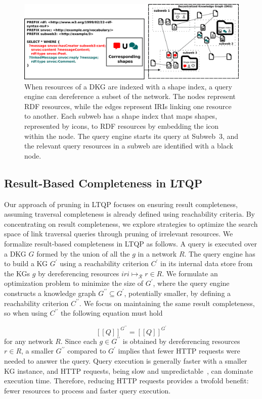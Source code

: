 \begin{figure}
    \centering
    \includegraphics[width=1.0\linewidth]{figure/dkg.pdf}
    \caption{
    When resources of a DKG are indexed with a shape index, a query engine can dereference a subset of the network.
    The nodes represent RDF resources, while the edges represent IRIs linking one resource to another.
    Each subweb has a shape index that maps shapes, represented by icons, to RDF resources by embedding the icon within the node.
    The query engine starts its query at Subweb~3, and the relevant query resources in a subweb are identified with a black node.
    }
    \label{fig:dkg}
\end{figure}

\subsection{Result-Based Completeness in LTQP}\label{sec:slde}

Our approach of pruning in LTQP focuses on ensuring result completeness, assuming traversal completeness is already defined using reachability criteria.
By concentrating on result completeness, we explore strategies to optimize the search space of link traversal queries through pruning of irrelevant resources.
We formalize result-based completeness in LTQP as follows.
A query is executed over a DKG $G$ formed by the union of all the $g$ in a network $R$.
The query engine has to build a KG $G^{\prime}$ using a reachability criterion $C^{\prime}$ in its internal data store from the KGs $g$ by dereferencing resources $iri \mapsto_{\mathcal{R}} r \in R$.
We formulate an optimization problem to minimize the size of $G^{\prime}$, where the query engine constructs a knowledge graph $G^{\prime\prime} \subseteq G^{\prime}$, potentially smaller, by defining a reachability criterion $C^{\prime\prime}$.
We focus on maintaining the same result completeness, so when using $C^{\prime\prime}$ the following equation must hold

\begin{equation}\label{eq:evalQueryStructuralAssumption}
   [\![ Q ]\!]^{G^{\prime\prime}} = [\![ Q ]\!]^{G^{\prime}}
\end{equation}
for any network $R$.
Since each $g \in G^{\prime\prime}$ is obtained by dereferencing resources $r \in R$, a smaller $G^{\prime\prime}$ compared to $G^{\prime}$ implies that fewer HTTP requests were needed to answer the query. 
Query execution is generally faster with a smaller KG instance, and HTTP requests, being slow and unpredictable~\cite{hartig2016walking}, can dominate execution time. 
Therefore, reducing HTTP requests provides a twofold benefit: fewer resources to process and faster query execution.


